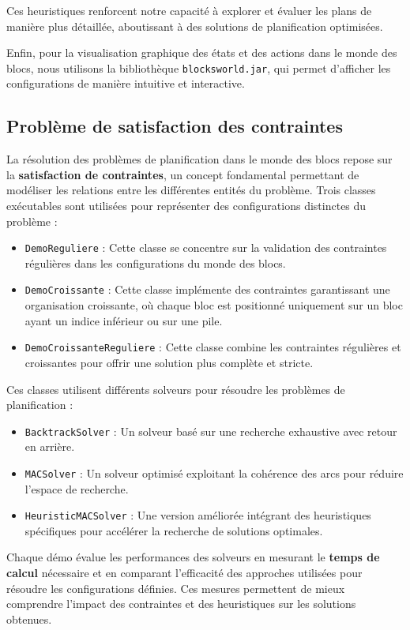 \documentclass[12pt]{article}
\begin{document}
Ces heuristiques renforcent notre capacité à explorer et évaluer les plans de manière plus détaillée, aboutissant à des solutions de planification optimisées.

Enfin, pour la visualisation graphique des états et des actions dans le monde des blocs, nous utilisons la bibliothèque \texttt{blocksworld.jar}, qui permet d’afficher les configurations de manière intuitive et interactive.

\subsection{Problème de satisfaction des contraintes}
La résolution des problèmes de planification dans le monde des blocs repose sur la \textbf{satisfaction de contraintes}, un concept fondamental permettant de modéliser les relations entre les différentes entités du problème. Trois classes exécutables sont utilisées pour représenter des configurations distinctes du problème :

\begin{itemize}
    \item \texttt{DemoReguliere} : Cette classe se concentre sur la validation des contraintes régulières dans les configurations du monde des blocs.
    \item \texttt{DemoCroissante} : Cette classe implémente des contraintes garantissant une organisation croissante, où chaque bloc est positionné uniquement sur un bloc ayant un indice inférieur ou sur une pile.
    \item \texttt{DemoCroissanteReguliere} : Cette classe combine les contraintes régulières et croissantes pour offrir une solution plus complète et stricte.
\end{itemize}

Ces classes utilisent différents solveurs pour résoudre les problèmes de planification :
\begin{itemize}
    \item \texttt{BacktrackSolver} : Un solveur basé sur une recherche exhaustive avec retour en arrière.
    \item \texttt{MACSolver} : Un solveur optimisé exploitant la cohérence des arcs pour réduire l'espace de recherche.
    \item \texttt{HeuristicMACSolver} : Une version améliorée intégrant des heuristiques spécifiques pour accélérer la recherche de solutions optimales.
\end{itemize}

Chaque démo évalue les performances des solveurs en mesurant le \textbf{temps de calcul} nécessaire et en comparant l'efficacité des approches utilisées pour résoudre les configurations définies. Ces mesures permettent de mieux comprendre l'impact des contraintes et des heuristiques sur les solutions obtenues.
\end{document}
